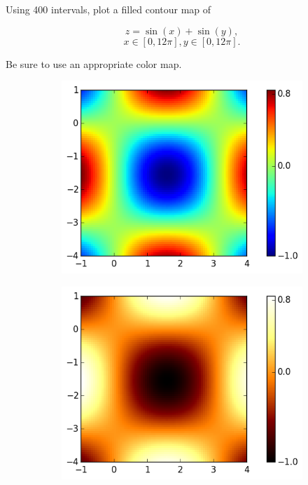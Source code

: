 \begin{problem}
Using 400 intervals, plot a filled contour map of

$$z = \sin(x) + \sin(y),$$ $$ x\in[0,12\pi], y\in[0,12\pi].$$ 

Be sure to use an appropriate color map. 
\end{problem}


\begin{figure}
\centering
\begin{subfigure}{.5\textwidth}
  \centering
  \includegraphics[width=\textwidth]{heatmap_color.png}
\end{subfigure}%
\begin{subfigure}{.5\textwidth}
  \centering
  \includegraphics[width=\textwidth]{heatmap_hot.png}

\end{subfigure}
\end{figure}
